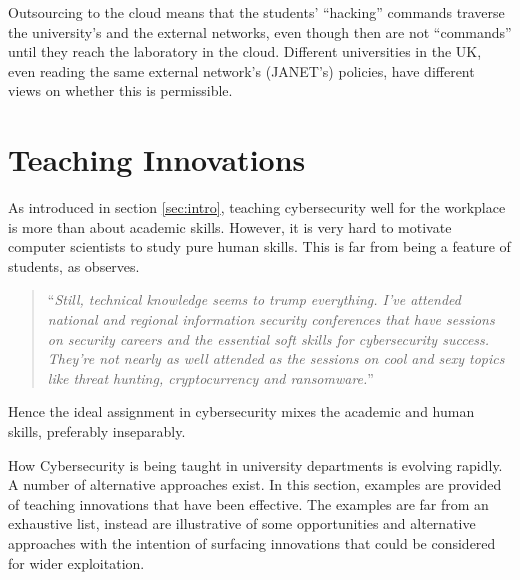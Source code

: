 \documentclass[conference]{IEEEtran}
\begin{document}
Outsourcing to the cloud means that the students' ``hacking'' commands traverse the university's and the external networks, even though then are not ``commands'' until they reach the laboratory in the cloud. Different universities in the UK, even reading the same external network's (JANET's) policies, have different views on whether this is permissible.






\section{Teaching Innovations}\label{sec:authors}
As introduced in section \ref{sec:intro}, teaching cybersecurity well for the workplace is more than about academic skills. However, it is very hard to motivate computer scientists to study pure human skills. This is far from being a feature of students, as \cite{Beaver2019c} observes.
\begin{quote}
``{\emph{Still, technical knowledge seems to trump everything. I've attended national and regional information security conferences that have sessions on security careers and the essential soft skills for cybersecurity success. They're not nearly as well attended as the sessions on cool and sexy topics like threat hunting, cryptocurrency and ransomware.}}''
\end{quote}
Hence the ideal assignment in cybersecurity mixes the academic and human skills, preferably inseparably.

How Cybersecurity is being taught in university departments is evolving rapidly. A number of alternative approaches exist. In this section, examples are provided of teaching innovations that have been effective. The examples are far from an exhaustive list, instead are illustrative of some opportunities and alternative approaches with the intention of surfacing innovations that could be considered for wider exploitation.
\end{document}
